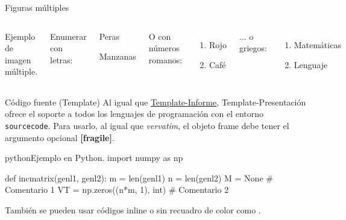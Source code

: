 
\begin{frame}{Figuras múltiples}
	\begin{columns}[c]
		\begin{images}{Ejemplo de imagen múltiple.}
			\imagesnewline
		\end{images}
		
		
		Enumerar con letras:
		
		\begin{enumeratebf}[label=\alph*) ] %
			\item Peras
			\item Manzanas
		\end{enumeratebf}
		
		O con números romanos:
		
		\begin{enumerate}[label=\roman*) ]
			\item Rojo
			\item Café
		\end{enumerate}
		
		$\ldots$ o griegos:
		
		\begin{enumerate}[label=\greek*) ]
			\item Matemáticas
			\item Lenguaje
		\end{enumerate}
	\end{columns}
\end{frame}


\begin{frame}[fragile]{Código fuente (Template)}
	Al igual que \href{https://latex.ppizarror.com/informe}{Template-Informe}, Template-Presentación ofrece el soporte a todos los lenguajes de programación con el entorno \texttt{sourcecode}. Para usarlo, al igual que \textit{vervatim}, el objeto frame debe tener el argumento opcional \textbf{[fragile]}.

\begin{sourcecode}{python}{Ejemplo en Python.}
import numpy as np

def incmatrix(genl1, genl2):
    m = len(genl1)
    n = len(genl2)
    M = None # Comentario 1
    VT = np.zeros((n*m, 1), int) # Comentario 2
\end{sourcecode}
	
	También se pueden usar códigos inline  o sin recuadro de color como .
\end{frame}

